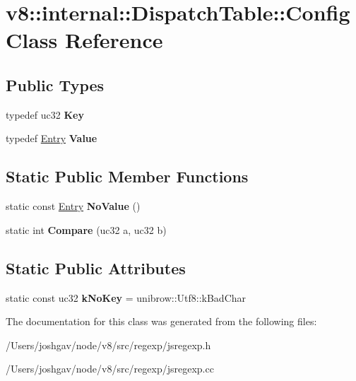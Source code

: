 \hypertarget{classv8_1_1internal_1_1_dispatch_table_1_1_config}{}\section{v8\+:\+:internal\+:\+:Dispatch\+Table\+:\+:Config Class Reference}
\label{classv8_1_1internal_1_1_dispatch_table_1_1_config}
\subsection*{Public Types}
\begin{DoxyCompactItemize}
\item 
typedef uc32 {\bfseries Key}\hypertarget{classv8_1_1internal_1_1_dispatch_table_1_1_config_a3e54d76bbce85cbd2193db08c09689cb}{}\label{classv8_1_1internal_1_1_dispatch_table_1_1_config_a3e54d76bbce85cbd2193db08c09689cb}

\item 
typedef \hyperlink{classv8_1_1internal_1_1_dispatch_table_1_1_entry}{Entry} {\bfseries Value}\hypertarget{classv8_1_1internal_1_1_dispatch_table_1_1_config_ac29a7427f5a168fed9eda9780321c7d6}{}\label{classv8_1_1internal_1_1_dispatch_table_1_1_config_ac29a7427f5a168fed9eda9780321c7d6}

\end{DoxyCompactItemize}
\subsection*{Static Public Member Functions}
\begin{DoxyCompactItemize}
\item 
static const \hyperlink{classv8_1_1internal_1_1_dispatch_table_1_1_entry}{Entry} {\bfseries No\+Value} ()\hypertarget{classv8_1_1internal_1_1_dispatch_table_1_1_config_a1ce800a2b555281b74ad8d63416358aa}{}\label{classv8_1_1internal_1_1_dispatch_table_1_1_config_a1ce800a2b555281b74ad8d63416358aa}

\item 
static int {\bfseries Compare} (uc32 a, uc32 b)\hypertarget{classv8_1_1internal_1_1_dispatch_table_1_1_config_a0e59c3e6a8320340e7b631946bb17cc3}{}\label{classv8_1_1internal_1_1_dispatch_table_1_1_config_a0e59c3e6a8320340e7b631946bb17cc3}

\end{DoxyCompactItemize}
\subsection*{Static Public Attributes}
\begin{DoxyCompactItemize}
\item 
static const uc32 {\bfseries k\+No\+Key} = unibrow\+::\+Utf8\+::k\+Bad\+Char\hypertarget{classv8_1_1internal_1_1_dispatch_table_1_1_config_a1960ae5bcfe8f4442eb9225e370f3ec1}{}\label{classv8_1_1internal_1_1_dispatch_table_1_1_config_a1960ae5bcfe8f4442eb9225e370f3ec1}

\end{DoxyCompactItemize}


The documentation for this class was generated from the following files\+:\begin{DoxyCompactItemize}
\item 
/\+Users/joshgav/node/v8/src/regexp/jsregexp.\+h\item 
/\+Users/joshgav/node/v8/src/regexp/jsregexp.\+cc\end{DoxyCompactItemize}
